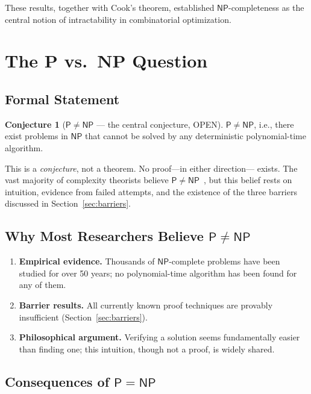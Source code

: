 \documentclass[12pt,a4paper]{amsart}
\theoremstyle{definition}
\newtheorem{conjecture}[theorem]{Conjecture}
\newcommand{\Pclass}{\mathsf{P}}
\newcommand{\NP}{\mathsf{NP}}
\begin{document}
These results, together with Cook's theorem, established $\NP$-completeness as
the central notion of intractability in combinatorial optimization.

\section{The P vs.\ NP Question}
\label{sec:pvsnp}

\subsection{Formal Statement}

\begin{conjecture}[$\Pclass\neq\NP$ --- the central conjecture, OPEN]
\label{conj:pvsnp}
$\Pclass \neq \NP$, i.e., there exist problems in $\NP$ that cannot be solved
by any deterministic polynomial-time algorithm.
\end{conjecture}

This is a \emph{conjecture}, not a theorem.  No proof---in either direction---
exists.  The vast majority of complexity theorists believe
$\Pclass\neq\NP$~\cite{gasarch2012}, but this belief rests on intuition,
evidence from failed attempts, and the existence of the three barriers discussed
in Section~\ref{sec:barriers}.

\subsection{Why Most Researchers Believe $\Pclass\neq\NP$}

\begin{enumerate}[label=(\alph*)]
  \item \textbf{Empirical evidence.}  Thousands of $\NP$-complete problems have
    been studied for over 50 years; no polynomial-time algorithm has been found
    for any of them.
  \item \textbf{Barrier results.}  All currently known proof techniques are
    provably insufficient (Section~\ref{sec:barriers}).
  \item \textbf{Philosophical argument.}  Verifying a solution seems
    fundamentally easier than finding one; this intuition, though not a proof,
    is widely shared.
\end{enumerate}

\subsection{Consequences of $\Pclass = \NP$}
\end{document}
